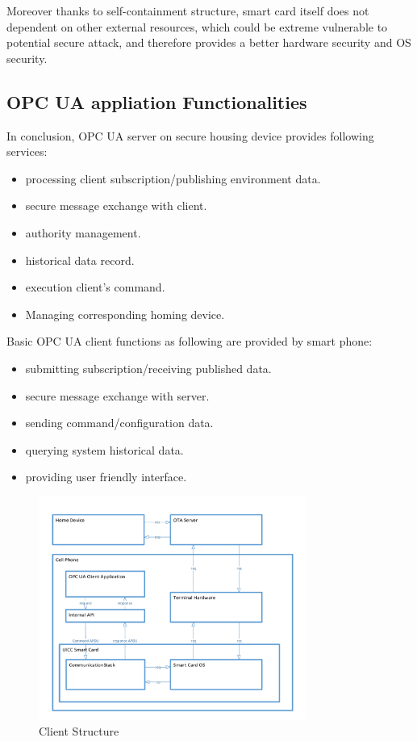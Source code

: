 Moreover thanks to self-containment structure, smart card itself does not dependent on other external resources, which could be extreme vulnerable to potential secure attack, and therefore provides a better hardware security and OS security. 

\subsection{OPC UA appliation Functionalities}\label{secFunction}
In conclusion, OPC UA server on secure housing device provides following services:
 \begin{itemize}
  \item processing client subscription/publishing environment data.
  \item secure message exchange with client.
  \item authority management.
  \item historical data record.
  \item execution client's command.
  \item Managing corresponding homing device.
\end{itemize}
Basic OPC UA client functions as following are provided by smart phone:
 \begin{itemize}
  \item submitting subscription/receiving published data.
  \item secure message exchange with server.
  \item sending command/configuration data.
  \item querying system historical data.
  \item providing user friendly interface.
\end{itemize}


 \begin{figure}[!htbp]
	\centering
	\includegraphics[width=0.78\textwidth]{clientStructure}
		\caption{Client Structure}
	\label{fig:clientStructure}
\end{figure}


